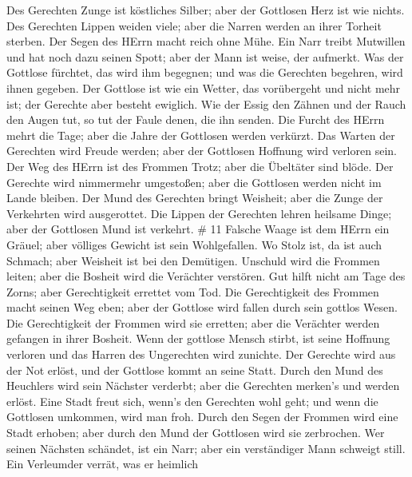  Des Gerechten Zunge ist köstliches Silber; aber der
Gottlosen Herz ist wie nichts.  Des Gerechten Lippen weiden
viele; aber die Narren werden an ihrer Torheit sterben. 
Der Segen des HErrn macht reich ohne Mühe.  Ein Narr treibt
Mutwillen und hat noch dazu seinen Spott; aber der Mann ist weise, der
aufmerkt.  Was der Gottlose fürchtet, das wird ihm
begegnen; und was die Gerechten begehren, wird ihnen gegeben.
 Der Gottlose ist wie ein Wetter, das vorübergeht und nicht
mehr ist; der Gerechte aber besteht ewiglich.  Wie der
Essig den Zähnen und der Rauch den Augen tut, so tut der Faule denen,
die ihn senden.  Die Furcht des HErrn mehrt die Tage; aber
die Jahre der Gottlosen werden verkürzt.  Das Warten der
Gerechten wird Freude werden; aber der Gottlosen Hoffnung wird verloren
sein.  Der Weg des HErrn ist des Frommen Trotz; aber die
Übeltäter sind blöde.  Der Gerechte wird nimmermehr
umgestoßen; aber die Gottlosen werden nicht im Lande bleiben.
 Der Mund des Gerechten bringt Weisheit; aber die Zunge der
Verkehrten wird ausgerottet.  Die Lippen der Gerechten
lehren heilsame Dinge; aber der Gottlosen Mund ist verkehrt. \# 11
 Falsche Waage ist dem HErrn ein Gräuel; aber völliges
Gewicht ist sein Wohlgefallen.  Wo Stolz ist, da ist auch
Schmach; aber Weisheit ist bei den Demütigen.  Unschuld wird
die Frommen leiten; aber die Bosheit wird die Verächter verstören.
 Gut hilft nicht am Tage des Zorns; aber Gerechtigkeit
errettet vom Tod.  Die Gerechtigkeit des Frommen macht
seinen Weg eben; aber der Gottlose wird fallen durch sein gottlos Wesen.
 Die Gerechtigkeit der Frommen wird sie erretten; aber die
Verächter werden gefangen in ihrer Bosheit.  Wenn der
gottlose Mensch stirbt, ist seine Hoffnung verloren und das Harren des
Ungerechten wird zunichte.  Der Gerechte wird aus der Not
erlöst, und der Gottlose kommt an seine Statt.  Durch den
Mund des Heuchlers wird sein Nächster verderbt; aber die Gerechten
merken's und werden erlöst.  Eine Stadt freut sich, wenn's
den Gerechten wohl geht; und wenn die Gottlosen umkommen, wird man froh.
 Durch den Segen der Frommen wird eine Stadt erhoben; aber
durch den Mund der Gottlosen wird sie zerbrochen.  Wer
seinen Nächsten schändet, ist ein Narr; aber ein verständiger Mann
schweigt still.  Ein Verleumder verrät, was er heimlich
